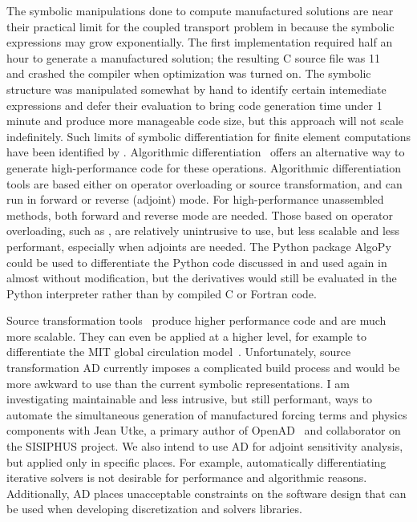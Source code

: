 The symbolic manipulations done to compute manufactured solutions are near their practical limit for the coupled transport problem in  because the symbolic expressions may grow exponentially.
The first implementation required half an hour to generate a manufactured solution; the resulting C source file was \SI{11}{\mega\byte} and crashed the compiler when optimization was turned on.
The symbolic structure was manipulated somewhat by hand to identify certain intemediate expressions and defer their evaluation to bring code generation time under 1 minute and produce more manageable code size, but this approach will not scale indefinitely.
Such limits of symbolic differentiation for finite element computations have been identified by \citet{wang1986finger,fritzson1992need,korelc1997automatic,korelc2002multi,wriggers2008nonlinear}.
Algorithmic differentiation~\citet{griewank2003mathematical,griewank2008evaluating} offers an alternative way to generate high-performance code for these operations.
Algorithmic differentiation tools are based either on operator overloading or source transformation, and can run in forward or reverse (adjoint) mode.
For high-performance unassembled methods, both forward and reverse mode are needed.
Those based on operator overloading, such as \citet{griewank1996adol,griewank1999adol,algopy-web}, are relatively unintrusive to use, but less scalable and less performant, especially when adjoints are needed.
The Python package AlgoPy~\citep{algopy-web,walter2010algorithmic} could be used to differentiate the Python code discussed in  and used again in  almost without modification, but the derivatives would still be evaluated in the Python interpreter rather than by compiled C or Fortran code.

Source transformation tools~\citep{bischof1997adic,utke2008openad} produce higher performance code and are much more scalable.
They can even be applied at a higher level, for example to differentiate the MIT global circulation model~\citep{heimbach2005efficient}.
Unfortunately, source transformation AD currently imposes a complicated build process and would be more awkward to use than the current symbolic representations.
I am investigating maintainable and less intrusive, but still performant, ways to automate the simultaneous generation of manufactured forcing terms and physics components with Jean Utke, a primary author of OpenAD~\citep{openad-userman,utke2004openad} and collaborator on the SISIPHUS project.
We also intend to use AD for adjoint sensitivity analysis, but applied only in specific places.
For example, automatically differentiating iterative solvers is not desirable for performance and algorithmic reasons.
Additionally, AD places unacceptable constraints on the software design that can be used when developing discretization and solvers libraries.

